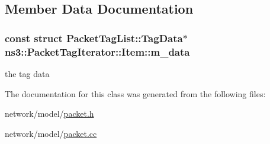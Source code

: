 \subsection{Member Data Documentation}
\subsubsection[{\texorpdfstring{m\+\_\+data}{m_data}}]{\setlength{\rightskip}{0pt plus 5cm}const struct {\bf Packet\+Tag\+List\+::\+Tag\+Data}$\ast$ ns3\+::\+Packet\+Tag\+Iterator\+::\+Item\+::m\+\_\+data\hspace{0.3cm}{\ttfamily [private]}}\hypertarget{classns3_1_1PacketTagIterator_1_1Item_a75b96e08083595ffe4bf71d57a73a197}{}\label{classns3_1_1PacketTagIterator_1_1Item_a75b96e08083595ffe4bf71d57a73a197}


the tag data 



The documentation for this class was generated from the following files\+:\begin{DoxyCompactItemize}
\item 
network/model/\hyperlink{packet_8h}{packet.\+h}\item 
network/model/\hyperlink{packet_8cc}{packet.\+cc}\end{DoxyCompactItemize}
